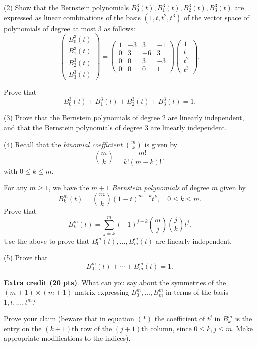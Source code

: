 \documentclass[12pt]{article}
\begin{document}
\medskip
(2)
Show that the Bernstein polynomials $B_0^3(t), B_1^3(t), B_2^3(t), B_3^3(t)$
are expressed as linear combinations of the basis
$(1, t, t^2, t^3)$ of the vector space of polynomials of degree at most $3$ 
as follows:
\[
\begin{pmatrix}
B_0^3(t)\\
B_1^3(t)\\
B_2^3(t) \\
B_3^3(t) 
\end{pmatrix} = 
\begin{pmatrix}
1 & -3  & 3 & -1 \\
0 &  3  & -6 & 3 \\
0 &  0  & 3  & -3 \\
0 &  0  & 0  & 1
\end{pmatrix} 
\begin{pmatrix}
1 \\
t \\
t^2\\
t^3
\end{pmatrix}. 
\]

Prove that
\[
B_0^3(t) +  B_1^3(t) +  B_2^3(t) + B_3^3(t) = 1.
\]

\medskip
(3)
Prove that the Bernstein polynomials of degree $2$
are linearly independent, and that
the Bernstein polynomials of degree $3$
are linearly independent.
  
\medskip
(4)
Recall that the {\it binomial coefficient\/} $\binom{m}{k}$ is given by
\[
\binom{m}{k} = \frac{m!}{k!(m - k)!},
\]
with $0 \leq k \leq m$.

\medskip
For any $m \geq 1$, we have the $m + 1$ 
{\it Bernstein polynomials\/} of degree $m$ given by
\[
B_k^m(t) = \binom{m}{k} (1 - t)^{m - k}t^k,
\quad 0 \leq k \leq m.
\]
Prove that
\begin{equation}
B_k^m(t) = \sum_{j = k}^m (-1)^{j - k} \binom{m}{j}\binom{j}{k} t^j.
\tag{$*$}
\end{equation}
Use the above to prove that $B_0^m(t), \ldots, B_m^m(t)$ are linearly
independent.

\medskip
(5)
Prove that 
\[
B_0^m(t)+  \cdots +  B_m^m(t) = 1.
\]


\medskip\noindent
{\bf Extra credit (20 pts)\/}.
What can you say about the symmetries of the $(m + 1)\times (m + 1)$ matrix
expressing $B_0^m, \ldots, B_m^m$ in terms of the basis
$1, t, \ldots,t^m$?

\medskip
Prove your claim (beware that in equation $(*)$
the coefficient of $t^j$ in $B^m_k$ is the
entry on the $(k + 1)$th row of the $(j + 1)$th column,
since $0 \leq k,j \leq m$.
Make appropriate modifications to the indices).
\end{document}
